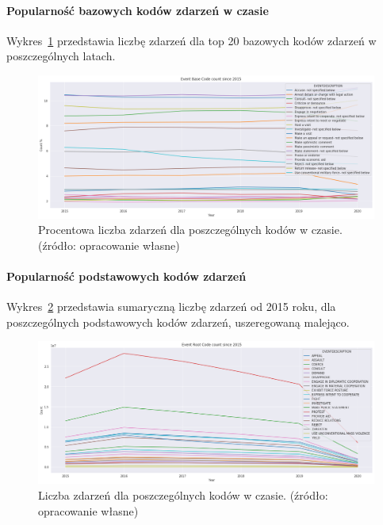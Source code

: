 \documentclass[11pt]{report}
\begin{document}
    \paragraph{Popularność bazowych kodów zdarzeń w czasie}
    Wykres~\ref{fig:GLOBALEBCperc} przedstawia liczbę zdarzeń dla top 20 bazowych kodów zdarzeń w poszczególnych latach.
    \begin{figure}[!htp]
        \centering
        \includegraphics[width=\linewidth]{fig/GLOBAL/EBCperc.png}
        \caption{Procentowa liczba zdarzeń dla poszczególnych kodów w czasie. (źródło: opracowanie własne)}
        \label{fig:GLOBALEBCperc}
    \end{figure}

    \paragraph{Popularność podstawowych kodów zdarzeń}
    Wykres~\ref{fig:GLOBALERC} przedstawia sumaryczną liczbę zdarzeń od 2015 roku, dla poszczególnych podstawowych kodów zdarzeń, uszeregowaną malejąco.
    \begin{figure}[!htp]
        \centering
        \includegraphics[width=\linewidth]{fig/GLOBAL/ERC.png}
        \caption{Liczba zdarzeń dla poszczególnych kodów w czasie. (źródło: opracowanie własne)}
        \label{fig:GLOBALERC}
    \end{figure}
\end{document}
